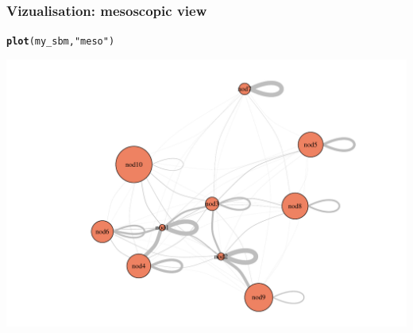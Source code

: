 \documentclass{beamer}\usepackage[]{graphicx}\usepackage[]{color}
\makeatletter
\newcommand{\hlstr}[1]{\textcolor[rgb]{0.192,0.494,0.8}{#1}}%
\newcommand{\hlstd}[1]{\textcolor[rgb]{0.345,0.345,0.345}{#1}}%
\newcommand{\hlkwd}[1]{\textcolor[rgb]{0.737,0.353,0.396}{\textbf{#1}}}%
\newenvironment{kframe}{%
 \def\at@end@of@kframe{}%
 \ifinner\ifhmode%
  \def\at@end@of@kframe{\end{minipage}}%
  \begin{minipage}{\columnwidth}%
 \fi\fi%
 \def\FrameCommand##1{\hskip\@totalleftmargin \hskip-\fboxsep
 \colorbox{shadecolor}{##1}\hskip-\fboxsep
     \hskip-\linewidth \hskip-\@totalleftmargin \hskip\columnwidth}%
 \MakeFramed {\advance\hsize-\width
   \@totalleftmargin\z@ \linewidth\hsize
   \@setminipage}}%
 {\par\unskip\endMakeFramed%
 \at@end@of@kframe}
\newenvironment{knitrout}{}{} %
\makeatother
\begin{document}
\begin{frame}[fragile]
  \frametitle{Vizualisation: mesoscopic view}

\begin{knitrout}\scriptsize
{}\color{fgcolor}\begin{kframe}
\begin{alltt}
\hlkwd{plot}\hlstd{(my_sbm,} \hlstr{"meso"}\hlstd{)}
\end{alltt}
\end{kframe}
\includegraphics[width=.8\textwidth]{figures/unnamed-chunk-17-1} 
\end{knitrout}


\end{frame}
\end{document}
